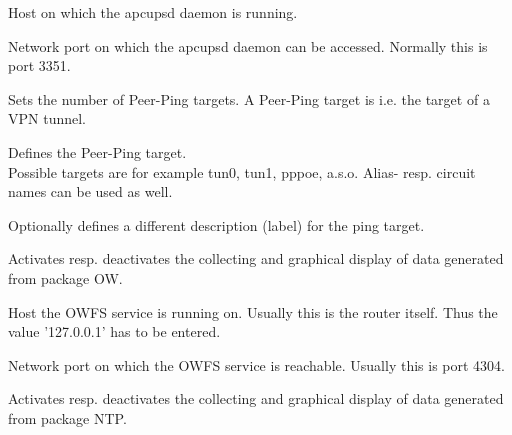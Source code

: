 \begin{description}

  Host on which the apcupsd daemon is running.


  Network port on which the apcupsd daemon can be accessed.
  Normally this is port 3351.


  Sets the number of Peer-Ping targets. A Peer-Ping target is i.e. the target
  of a VPN tunnel.


  Defines the Peer-Ping target. \\
  Possible targets are for example tun0, tun1, pppoe, a.s.o. Alias- resp. circuit
  names can be used as well.


  Optionally defines a different description (label) for the ping target.


  Activates resp. deactivates the collecting and graphical display of
  data generated from package OW.


  Host the OWFS service is running on. Usually this is the router
  itself. Thus the value '127.0.0.1' has to be entered.


  Network port on which the OWFS service is reachable.
  Usually this is port 4304.


  Activates resp. deactivates the collecting and graphical display of
  data generated from package NTP.

\end{description}

